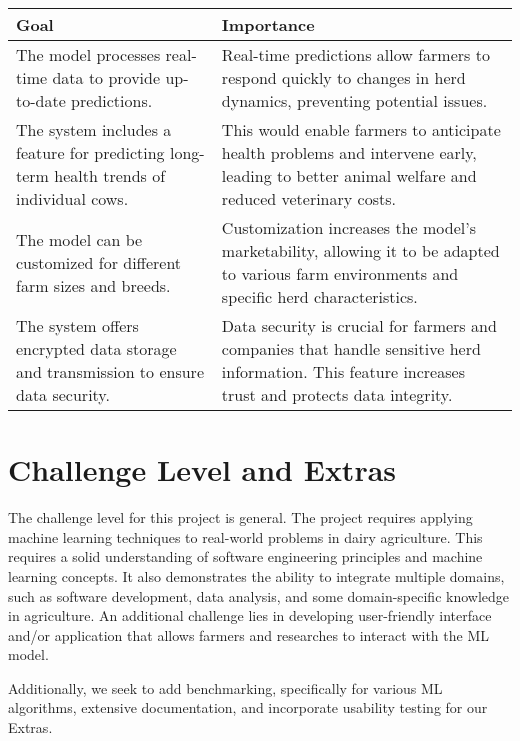 \documentclass{article}
\begin{document}
\begin{table}[H]
\centering
\begin{tabularx}{\textwidth}{|p{}|p{}|} 
\hline
\textbf{Goal} & \textbf{Importance} \\ \hline
The model processes real-time data to provide up-to-date predictions. & 
Real-time predictions allow farmers to respond quickly to changes in herd 
dynamics, preventing potential issues. \\ \hline
The system includes a feature for predicting long-term health trends of 
individual cows. & This would enable farmers to anticipate health problems and 
intervene early, leading to better animal welfare and reduced veterinary costs. 
\\ \hline
The model can be customized for different farm sizes and breeds. & 
Customization increases the model's marketability, allowing it to be adapted to 
various farm environments and specific herd characteristics. \\ \hline
The system offers encrypted data storage and transmission to ensure data 
security. & Data security is crucial for farmers and companies that handle 
sensitive herd information. This feature increases trust and protects data 
integrity. \\ \hline
\end{tabularx}
\end{table}

\FloatBarrier

\section{Challenge Level and Extras}

The challenge level for this project is general. The project requires applying
machine learning techniques to real-world problems in dairy agriculture. This
requires a solid understanding of software engineering principles and machine
learning concepts. It also demonstrates the ability to integrate multiple
domains, such as software development, data analysis, and some domain-specific
knowledge in agriculture. An additional challenge lies in developing 
user-friendly interface and/or application that allows farmers and researches
to interact with the ML model. 

Additionally, we seek to add benchmarking, specifically for various ML 
algorithms, extensive documentation, and incorporate usability testing
for our Extras. 
\end{document}
